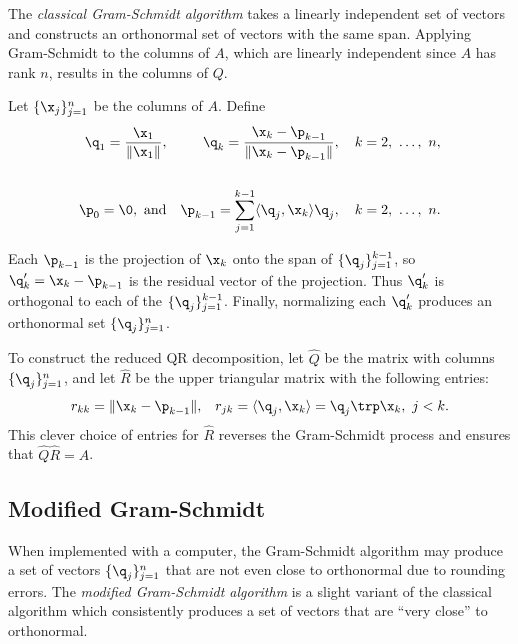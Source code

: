 The \emph{classical Gram-Schmidt algorithm} takes a linearly independent set of vectors and constructs an orthonormal set of vectors with the same span.
Applying Gram-Schmidt to the columns of $A$, which are linearly independent since $A$ has rank $n$, results in the columns of $Q$.

Let $\{\x_j\}_{j=1}^n$ be the columns of $A$.
Define
%
\begin{align*}
\q_1 = \frac{\x_1}{\|\x_1\|},
&&
\q_{k} = \frac{\x_k - \p_{k-1}}{\|\x_k - \p_{k-1}\|},\quad k=2,\ \ldots,\ n,
\\ \\
\p_0 = \0,\ \text{and}
&&
\p_{k-1} = \sum_{j=1}^{k-1} \langle \q_j, \x_k\rangle \q_j,\quad k=2,\ \ldots,\ n.
\end{align*}

Each $\p_{k-1}$ is the projection of $\x_k$ onto the span of $\{\q_j\}_{j=1}^{k-1}$, so $\q_k' = \x_k - \p_{k-1}$ is the residual vector of the projection.
Thus $\q_k'$ is orthogonal to each of the $\{\q_j\}_{j=1}^{k-1}$.
Finally, normalizing each $\q_k'$ produces an orthonormal set $\{\q_j\}_{j=1}^n$.

To construct the reduced QR decomposition, let $\widehat{Q}$ be the matrix with columns $\{\q_j\}_{j=1}^n$, and let $\widehat{R}$ be the upper triangular matrix with the following entries:
%
\begin{align*}
r_{kk} = \|\x_k-\p_{k-1}\|,
&&
r_{jk} = \langle \q_j, \x_k\rangle = \q_j\trp\x_k,\ j < k.
\end{align*}
%
This clever choice of entries for $\widehat{R}$ reverses the Gram-Schmidt process and ensures that $\widehat{Q}\widehat{R} = A$.

\begin{comment}
To construct the full QR decomposition, choose $m - n$ vectors $\{\x_j\}_{j=n+1}^m$ such that the entire set of original vectors $\{\x_j\}_{j=1}^m$ is linearly independent, then continue the Gram-Schmidt process to produce the additional columns of $Q$.
Appending $m - n$ rows of zeros to $\widehat{R}$ results in $R$.
\end{comment}

\subsection*{Modified Gram-Schmidt} %

When implemented with a computer, the Gram-Schmidt algorithm may produce a set of vectors $\{\q_j\}_{j=1}^n$ that are not even close to orthonormal due to rounding errors.
The \emph{modified Gram-Schmidt algorithm} is a slight variant of the classical algorithm which consistently produces a set of vectors that are ``very close'' to orthonormal.


